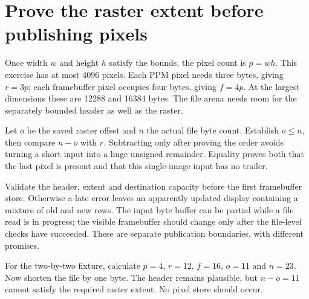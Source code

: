 \section{Prove the raster extent before publishing pixels}
Once width \(w\) and height \(h\) satisfy the bounds, the pixel count is \(p=wh\).
This exercise has at most 4096 pixels. Each PPM pixel needs three bytes, giving
\(r=3p\); each framebuffer pixel occupies four bytes, giving \(f=4p\).
At the largest dimensions these are 12288 and 16384 bytes. The file arena needs room
for the separately bounded header as well as the raster.

Let \(o\) be the saved raster offset and \(n\) the actual file byte count. Establish
\(o\leq n\), then compare \(n-o\) with \(r\). Subtracting only after proving the order
avoids turning a short input into a huge unsigned remainder. Equality proves both that
the last pixel is present and that this single-image input has no trailer.

Validate the header, extent and destination capacity before the first framebuffer
store. Otherwise a late error leaves an apparently updated display containing a mixture
of old and new rows. The input byte buffer can be partial while a file read is in
progress; the visible framebuffer should change only after the file-level checks have
succeeded. These are separate publication boundaries, with different promises.

For the two-by-two fixture, calculate \(p=4\), \(r=12\), \(f=16\), \(o=11\) and
\(n=23\). Now shorten the file by one byte. The header remains plausible, but
\(n-o=11\) cannot satisfy the required raster extent. No pixel store should occur.

